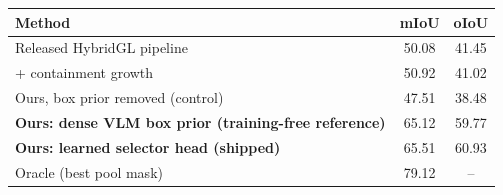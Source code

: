 \begin{tabular}{lcc}
\toprule
Method & mIoU & oIoU \\
\midrule
Released HybridGL pipeline & 50.08 & 41.45 \\
+ containment growth & 50.92 & 41.02 \\
Ours, box prior removed (control) & 47.51 & 38.48 \\
\textbf{Ours: dense VLM box prior (training-free reference)} & 65.12 & 59.77 \\
\textbf{Ours: learned selector head (shipped)} & 65.51 & 60.93 \\
\midrule
Oracle (best pool mask) & 79.12 & -- \\
\bottomrule
\end{tabular}
